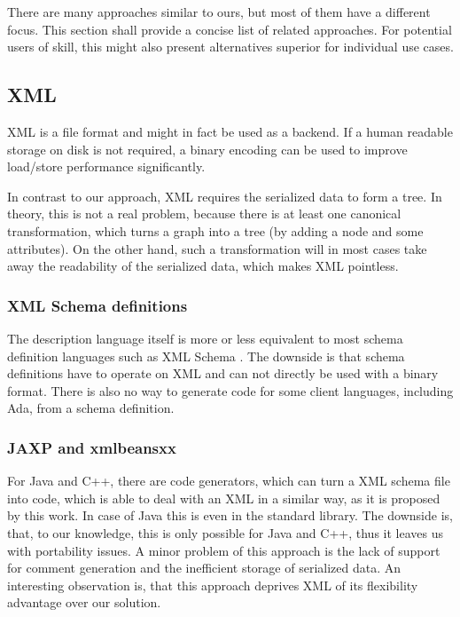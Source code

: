\documentclass[a4paper,10pt]{article}
\begin{document}
There are many approaches similar to ours, but most of them have a different focus. This section shall provide a concise list of related approaches. For potential users of skill, this might also present alternatives superior for individual use cases.

\subsection*{XML}

XML is a file format and might in fact be used as a backend. If a human readable storage on disk is not required, a binary encoding can be used to improve load/store performance significantly.

In contrast to our approach, XML requires the serialized data to form a tree. In theory, this is not a real problem, because there is at least one canonical transformation, which turns a graph into a tree (by adding a node and some attributes). On the other hand, such a transformation will in most cases take away the readability of the serialized data, which makes XML pointless.

\subsubsection*{XML Schema definitions}

The description language itself is more or less equivalent to most schema definition languages such as XML Schema . The downside is that schema definitions have to operate on XML and can not directly be used with a binary format. There is also
no way to generate code for some client languages, including Ada, from a schema definition.

\subsubsection*{JAXP and xmlbeansxx}

For Java and C++, there are code generators, which can turn a XML schema file into code, which is able to deal with an XML in a similar way, as it is proposed by this work. In case of Java this is even in the standard library. The downside is, that, to our knowledge, this is only possible for Java and C++, thus it leaves us with portability issues. A minor problem of this approach is the lack of support for comment generation and the inefficient storage of serialized data.
An interesting observation is, that this approach deprives XML of its flexibility advantage over our solution. 
\end{document}
